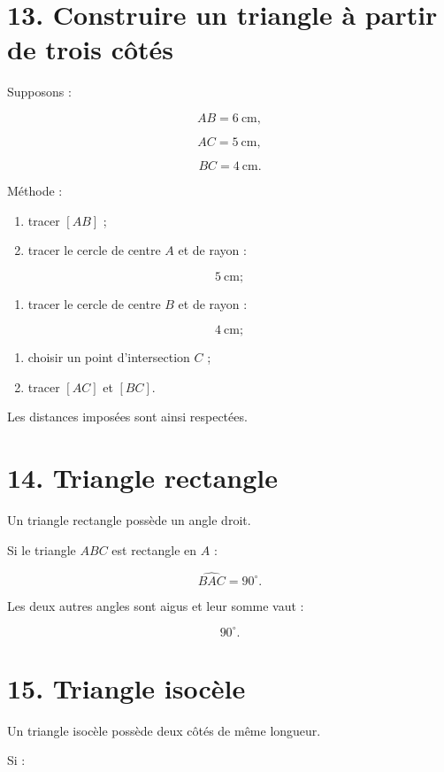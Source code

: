 \section{13. Construire un triangle à partir de trois côtés}

Supposons :

\[
AB=6\ \text{cm},
\]

\[
AC=5\ \text{cm},
\]

\[
BC=4\ \text{cm}.
\]

Méthode :

\begin{enumerate}
\item tracer $[AB]$ ;
\item tracer le cercle de centre $A$ et de rayon :
\end{enumerate}

\[
5\ \text{cm};
\]

\begin{enumerate}
\item tracer le cercle de centre $B$ et de rayon :
\end{enumerate}

\[
4\ \text{cm};
\]

\begin{enumerate}
\item choisir un point d’intersection $C$ ;
\item tracer $[AC]$ et $[BC]$.
\end{enumerate}

Les distances imposées sont ainsi respectées.

\section{14. Triangle rectangle}

Un triangle rectangle possède un angle droit.

Si le triangle $ABC$ est rectangle en $A$ :

\[
\widehat{BAC}=90^\circ.
\]

Les deux autres angles sont aigus et leur somme vaut :

\[
90^\circ.
\]

\section{15. Triangle isocèle}

Un triangle isocèle possède deux côtés de même longueur.

Si :

